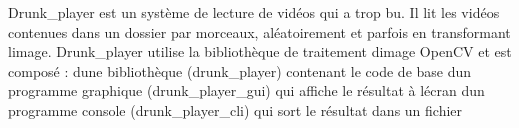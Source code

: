 Drunk\+\_\+player est un système de lecture de vidéos qui a trop bu. Il lit les vidéos contenues dans un dossier par morceaux, aléatoirement et parfois en transformant l\textquotesingle{}image. Drunk\+\_\+player utilise la bibliothèque de traitement d\textquotesingle{}image Open\+CV et est composé \+: d\textquotesingle{}une bibliothèque (drunk\+\_\+player) contenant le code de base d\textquotesingle{}un programme graphique (drunk\+\_\+player\+\_\+gui) qui affiche le résultat à l\textquotesingle{}écran d\textquotesingle{}un programme console (drunk\+\_\+player\+\_\+cli) qui sort le résultat dans un fichier 